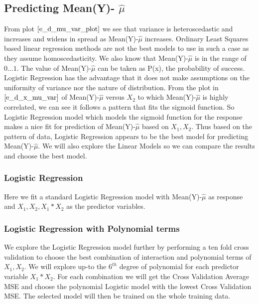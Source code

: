 \documentclass[twoside,12pt]{article}
\begin{document}
\subsection{Predicting Mean(Y)- $\hat{\mu}$}
From plot $\eqref{e_d_mu_var_plot}$ we see that variance is heteroscedastic and increases and widens in spread as Mean(Y)-$\hat{\mu}$ increases. Ordinary Least Squares based linear regression methods are not the best models to use in such a case as they assume homoscedasticity. We also know that Mean(Y)-$\hat{\mu}$ is in the range of $0\dots 1$. The value of Mean(Y)-$\hat{\mu}$ can be taken as P(x), the probability of success. Logistic Regression has the advantage that it does not make assumptions on the uniformity of variance nor the nature of distribution.  From the plot in $\eqref{e_d_x_mu_var}$ of Mean(Y)-$\hat{\mu}$ versus $X_2$ to which Mean(Y)-$\hat{\mu}$ is highly correlated, we can see it follows a pattern that fits the sigmoid function. So Logistic Regression model which models the sigmoid function for the response makes a nice fit for prediction of Mean(Y)-$\hat{\mu}$ based on $X_1,X_2$. Thus based on the pattern of data, Logistic Regression appears to be the best model for predicting Mean(Y)-$\hat{\mu}$. We will also explore the Linear Models so we can compare the results and choose the best model.

\subsubsection{Logistic Regression}
Here we fit a standard Logistic Regression model with Mean(Y)-$\hat{\mu}$ as response and $X_1,X_2,X_1*X_2$ as the predictor variables.

\subsubsection{Logistic Regression with Polynomial terms}
We explore the Logistic Regression model further by performing a ten fold cross validation to choose the best combination of interaction and polynomial terms of $X_1,X_2$. We will explore up-to the $6^{th}$ degree of polynomial for each predictor variable $X_1*X_2$. For each combination we will get the Cross Validation Average MSE and choose the polynomial Logistic model with the lowest Cross Validation MSE. The selected model will then be trained on the whole training data.
\end{document}
